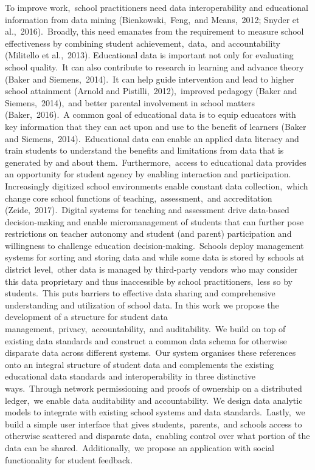 \documentclass{article}
\begin{document}
To improve work,\ school practitioners need data interoperability and educational information from data mining (Bienkowski,\ Feng,\ and Means,\ 2012; Snyder et al.,\ 2016).\ Broadly, this need emanates from the requirement to measure school effectiveness by combining student achievement,\ data,\ and accountability (Militello et al.,\ 2013).
\bigbreak
Educational data is important not only for evaluating school quality.\ It can also contribute to research in learning and advance theory (Baker and Siemens,\ 2014).\ It can help guide intervention and lead to higher school attainment (Arnold and Pistilli,\ 2012),\ improved pedagogy (Baker and Siemens,\ 2014),\ and better parental involvement in school matters (Baker,\ 2016).\ A common goal of educational data is to equip educators with key information that they can act upon and use to the benefit of learners (Baker and Siemens,\ 2014).\ Educational data can enable an applied data literacy and train students to understand the benefits and limitations from data that is generated by and about them.\ Furthermore,\ access to educational data provides an opportunity for student agency by enabling interaction and participation.
\bigbreak
Increasingly digitized school environments enable constant data collection,\ which change core school functions of teaching,\ assessment,\ and accreditation (Zeide,\ 2017).\ Digital systems for teaching and assessment drive data-based decision-making and enable micromanagement of students that can further pose restrictions on teacher autonomy and student (and parent) participation and willingness to challenge education decision-making.\ Schools deploy management systems for sorting and storing data and while some data is stored by schools at district level,\ other data is managed by third-party vendors who may consider this data proprietary and thus inaccessible by school practitioners,\ less so by students.\ This puts barriers to effective data sharing and comprehensive understanding and utilization of school data.
\bigbreak
In this work we propose the development of a structure for student data management,\ privacy,\ accountability,\ and auditability.\ We build on top of existing data standards and construct a common data schema for otherwise disparate data across different systems.\ Our system organises these references onto an integral structure of student data and complements the existing educational data standards and interoperability in three distinctive ways.\ Through network permissioning and proofs of ownership on a distributed ledger,\ we enable data auditability and accountability.\ We design data analytic models to integrate with existing school systems and data standards.\ Lastly,\ we build a simple user interface that gives students,\ parents,\ and schools access to otherwise scattered and disparate data,\ enabling control over what portion of the data can be shared.\ Additionally,\ we propose an application with social functionality for student feedback.\ 
\end{document}
